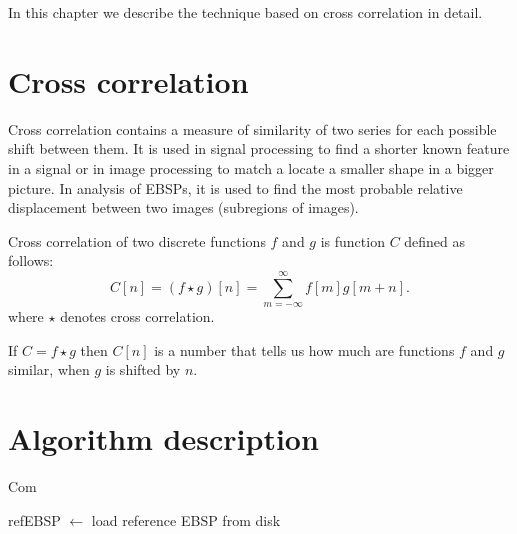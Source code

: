 In this chapter we describe the technique based on cross correlation in detail.

\section{Cross correlation}

Cross correlation contains a measure of similarity of two series for each possible shift between them. It is used in signal processing to find a shorter known feature in a signal or in image processing to match a locate a smaller shape in a bigger picture. In analysis of EBSPs, it is used to find the most probable relative displacement between two images (subregions of images).

Cross correlation of two discrete functions $f$ and $g$ is function $C$ defined as follows:
$$
C[n] = (f \star g)[n] = \sum_{m=-\infty}^{\infty}f[m]g[m+n].
$$
where $\star$ denotes cross correlation.

If $C = f \star g$ then $C[n]$ is a number that tells us how much are functions $f$ and $g$ similar, when $g$ is shifted by $n$.

\section{Algorithm description}

\begin{algorithm}
	\caption{Com}
	
	\vspace{5px}
	
	refEBSP  $\leftarrow$ load reference EBSP from disk\;
	
	
	
\end{algorithm}

